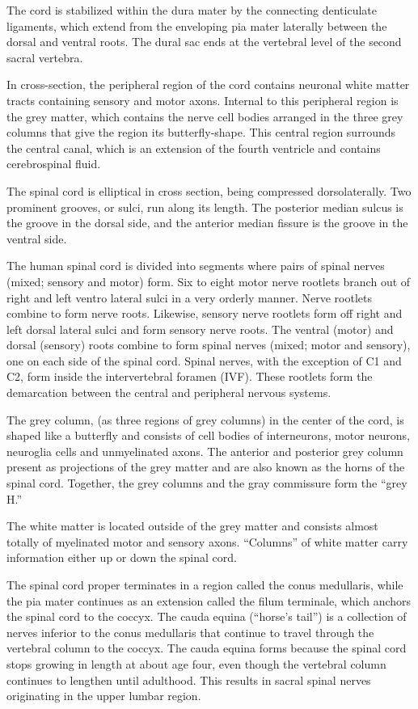 \documentclass[]{book}
\begin{document}
The cord is stabilized within the dura mater by the connecting denticulate ligaments, which extend from the enveloping pia mater laterally between the dorsal and ventral roots. The dural sac ends at the vertebral level of the second sacral vertebra.

In cross-section, the peripheral region of the cord contains neuronal white matter tracts containing sensory and motor axons. Internal to this peripheral region is the grey matter, which contains the nerve cell bodies arranged in the three grey columns that give the region its butterfly-shape. This central region surrounds the central canal, which is an extension of the fourth ventricle and contains cerebrospinal fluid.

The spinal cord is elliptical in cross section, being compressed dorsolaterally. Two prominent grooves, or sulci, run along its length. The posterior median sulcus is the groove in the dorsal side, and the anterior median fissure is the groove in the ventral side.

The human spinal cord is divided into segments where pairs of spinal nerves (mixed; sensory and motor) form. Six to eight motor nerve rootlets branch out of right and left ventro lateral sulci in a very orderly manner. Nerve rootlets combine to form nerve roots. Likewise, sensory nerve rootlets form off right and left dorsal lateral sulci and form sensory nerve roots. The ventral (motor) and dorsal (sensory) roots combine to form spinal nerves (mixed; motor and sensory), one on each side of the spinal cord. Spinal nerves, with the exception of C1 and C2, form inside the intervertebral foramen (IVF). These rootlets form the demarcation between the central and peripheral nervous systems.

The grey column, (as three regions of grey columns) in the center of the cord, is shaped like a butterfly and consists of cell bodies of interneurons, motor neurons, neuroglia cells and unmyelinated axons. The anterior and posterior grey column present as projections of the grey matter and are also known as the horns of the spinal cord. Together, the grey columns and the gray commissure form the ``grey H.''

The white matter is located outside of the grey matter and consists almost totally of myelinated motor and sensory axons. ``Columns'' of white matter carry information either up or down the spinal cord.

The spinal cord proper terminates in a region called the conus medullaris, while the pia mater continues as an extension called the filum terminale, which anchors the spinal cord to the coccyx. The cauda equina (``horse's tail'') is a collection of nerves inferior to the conus medullaris that continue to travel through the vertebral column to the coccyx. The cauda equina forms because the spinal cord stops growing in length at about age four, even though the vertebral column continues to lengthen until adulthood. This results in sacral spinal nerves originating in the upper lumbar region.
\end{document}
